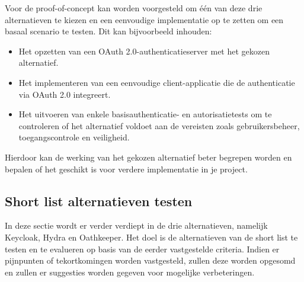 Voor de proof-of-concept kan worden voorgesteld om één van deze drie alternatieven te kiezen en een eenvoudige implementatie op te zetten om een basaal scenario te testen. Dit kan bijvoorbeeld inhouden:

\begin{itemize}
    \item Het opzetten van een OAuth 2.0-authenticatieserver met het gekozen alternatief.
    \item Het implementeren van een eenvoudige client-applicatie die de authenticatie via OAuth 2.0 integreert.
    \item Het uitvoeren van enkele basisauthenticatie- en autorisatietests om te controleren of het alternatief voldoet aan de vereisten zoals gebruikersbeheer, toegangscontrole en veiligheid.
\end{itemize}

Hierdoor kan de werking van het gekozen alternatief beter begrepen worden en bepalen of het geschikt is voor verdere implementatie in je project.

\subsection{Short list alternatieven testen}
\label{subsec:short-list-alternatieven-testen}
In deze sectie wordt er verder verdiept in de drie alternatieven, namelijk Keycloak, Hydra en Oathkeeper.
Het doel is de alternatieven van de short list te testen en te evalueren op basis van de eerder vastgestelde criteria. Indien er pijnpunten of tekortkomingen worden vastgesteld, zullen deze worden opgesomd en zullen er suggesties worden gegeven voor mogelijke verbeteringen.

